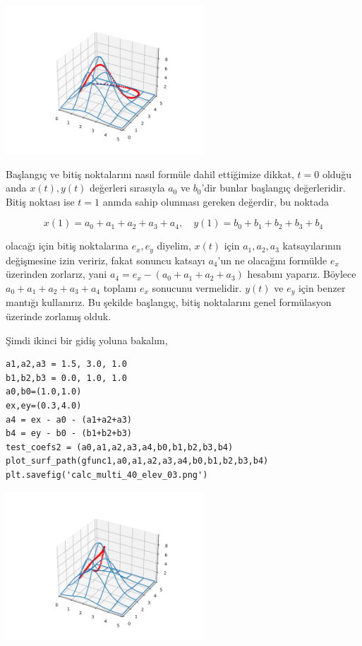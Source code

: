 \documentclass[12pt,fleqn]{article}\usepackage{../../common}
\begin{document}
\includegraphics[width=20em]{calc_multi_40_elev_01.png}

Başlangıç ve bitiş noktalarını nasıl formüle dahil ettiğimize dikkat, $t=0$
olduğu anda $x(t),y(t)$ değerleri sırasıyla $a_0$ ve $b_0$'dir bunlar başlangıç
değerleridir. Bitiş noktası ise $t=1$ anında sahip olunması gereken değerdir,
bu noktada

$$
x(1) = a_0 + a_1 + a_2 + a_3 + a_4 ,\quad
y(1) = b_0 + b_1 + b_2 + b_3 + b_4 
$$

olacağı için bitiş noktalarına $e_x,e_y$ diyelim, $x(t)$ için $a_1,a_2,a_3$
katsayılarının değişmesine izin veririz, fakat sonuncu katsayı $a_4$'un ne
olacağını formülde $e_x$ üzerinden zorlarız, yani $a_4 = e_x - (a_0 + a_1 + a_2
+ a_3)$ hesabını yaparız. Böylece $a_0 + a_1 + a_2 + a_3 + a_4$ toplamı $e_x$
sonucunu vermelidir. $y(t)$ ve $e_y$ için benzer mantığı kullanırız.  Bu şekilde
başlangıç, bitiş noktalarını genel formülasyon üzerinde zorlamış olduk.

Şimdi ikinci bir gidiş yoluna bakalım, 

\begin{verbatim}
a1,a2,a3 = 1.5, 3.0, 1.0
b1,b2,b3 = 0.0, 1.0, 1.0
a0,b0=(1.0,1.0)
ex,ey=(0.3,4.0)
a4 = ex - a0 - (a1+a2+a3)
b4 = ey - b0 - (b1+b2+b3)
test_coefs2 = (a0,a1,a2,a3,a4,b0,b1,b2,b3,b4)
plot_surf_path(gfunc1,a0,a1,a2,a3,a4,b0,b1,b2,b3,b4)
plt.savefig('calc_multi_40_elev_03.png')
\end{verbatim}

\includegraphics[width=20em]{calc_multi_40_elev_03.png}
\end{document}
